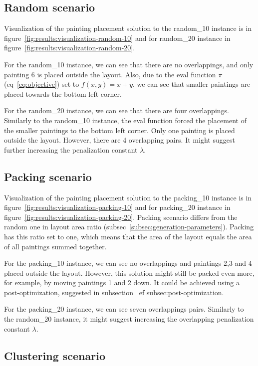 \newpage

\subsection{Random scenario}\label{subsec:random-scenario}

Visualization of the painting placement solution to the random\_10 instance
is in figure~\ref{fig:results:visualization-random-10}
and for random\_20 instance in figure~\ref{fig:results:visualization-random-20}.

For the random\_10 instance, we can see that there are no overlappings, and only painting 6 is placed outside the layout.
Also, due to the eval function $\pi$ (eq~\ref{eq:objective}) set to
$f(x,y) = x+y$, we can see that smaller paintings
are placed towards the bottom left corner.

For the random\_20 instance, we can see that there are four overlappings.
Similarly to the random\_10 instance, the eval function forced the placement of the
smaller paintings to the bottom left corner.
Only one painting is placed outside the layout.
However, there are 4 overlapping pairs.
It might suggest further increasing the penalization constant $\lambda$.

\subsection{Packing scenario}\label{subsec:packing-scenario}
Visualization of the painting placement solution to the packing\_10 instance
is in figure~\ref{fig:results:visualization-packing-10}
and for packing\_20 instance in figure~\ref{fig:results:visualization-packing-20}.
Packing scenario differs from the random one in layout area ratio (subsec~\ref{subsec:generation-parameters}).
Packing has this ratio set to one, which means that the area of the layout equals the area of all paintings summed together.

For the packing\_10 instance, we can see no overlappings and paintings 2,3 and 4 placed outside the layout.
However, this solution might still be packed even more, for example, by moving paintings 1 and 2 down.
It could be achieved using a post-optimization, suggested in subsection~ ef {subsec:post-optimization}.

For the packing\_20 instance, we can see seven overlappings pairs.
Similarly to the random\_20 instance, it might suggest increasing the overlapping penalization constant $\lambda$.

\subsection{Clustering scenario}\label{subsec:clustering-scenario}

